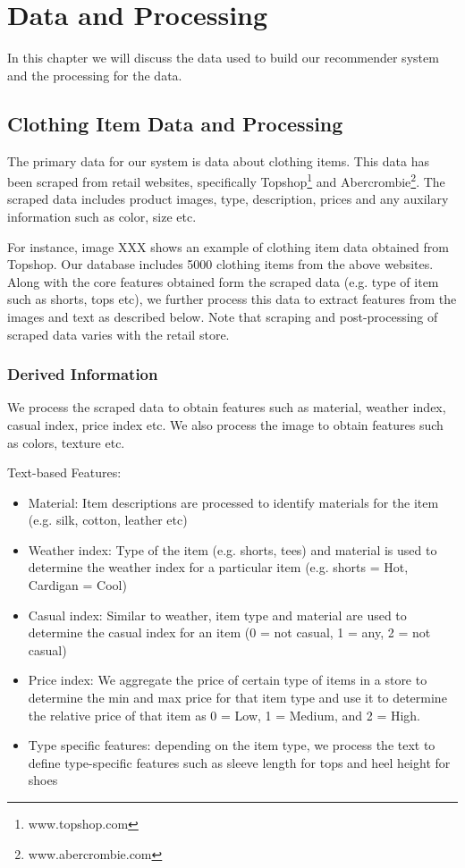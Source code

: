 \chapter{Data and Processing}

In this chapter we will discuss the data used to build our recommender system
and the processing for the data.

\section{Clothing Item Data and Processing}

The primary data for our system is data about clothing items. This data has been
scraped from retail websites, specifically Topshop\footnote{www.topshop.com} and
Abercrombie\footnote{www.abercrombie.com}. The scraped data includes product
images, type, description, prices and any auxilary information such as color,
size etc. 

For instance, image XXX shows an example of clothing item data obtained from
Topshop. Our database includes 5000 clothing items from the above websites.
Along with the core features obtained form the scraped data (e.g.
type of item such as shorts, tops etc), we further process this data to extract
features from the images and text as described below. Note that scraping and
post-processing of scraped data varies with the retail store.

\subsection{Derived Information}

We process the scraped data to obtain features such as material, weather index,
casual index, price index etc. We also process the image to obtain features such
as colors, texture etc.

Text-based Features:
\begin{itemize}
  \item Material: Item descriptions are processed to identify materials for the
  item (e.g. silk, cotton, leather etc)
  \item Weather index: Type of the item (e.g. shorts, tees) and material is used
  to determine the weather index for a particular item (e.g. shorts = Hot,
  Cardigan = Cool)
  \item Casual index: Similar to weather, item type and material are used to
  determine the casual index for an item (0 = not casual, 1 = any, 2 = not
  casual)
  \item Price index: We aggregate the price of certain type of items in a
  store to determine the min and max price for that item type and use it to
  determine the relative price of that item as 0 = Low, 1 = Medium, and 2 =
  High.
  \item Type specific features: depending on the item type, we process the text
  to define type-specific features such as sleeve length for tops and heel
  height for shoes
\end{itemize}

